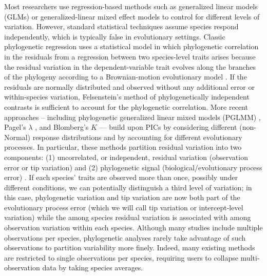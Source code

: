 \documentclass[12pt]{article}
\begin{document}
Most researchers use regression-based methods such as generalized linear models (GLMs) or generalized-linear mixed effect models \citep[GLMMs:][]{bolker2009generalized} to control for different levels of variation.
However, standard statistical techniques assume species respond independently, which is typically false in evolutionary settings.
Classic phylogenetic regression uses a statistical model in which phylogenetic correlation in the residuals from a regression between two species-level traits arises because the residual variation in the dependent-variable trait evolves along the branches of the phylogeny according to a Brownian-motion evolutionary model \citep{felsenstein1985phylogenies}. 
If the residuals are normally distributed and observed without any additional error or within-species variation, Felsenstein's method of phylogenetically independent contrasts  \citep[PICS:][]{felsenstein1985phylogenies, nicolakakis2000forebrain} is sufficient to account for the phylogenetic correlation.
More recent approaches -- including phylogenetic generalized linear mixed models (PGLMM) \citep{ives2011generalized, housworth2004phylogenetic}, Pagel's $\lambda$ \citep{pagel1999inferring}, and Blomberg's $K$ \citep{blomberg2003testing} --- build upon PICs by considering different (non-Normal) response distributions and by accounting for different evolutionary processes. 
In particular, these methods partition residual variation into two components: (1) uncorrelated, or independent, residual variation (observation error or tip variation) and (2) phylogenetic signal  (biological/evolutionary process error) \citep{hansen2012interpreting, housworth2004phylogenetic}.
If each species' traits are observed more than once, possibly under different conditions, we can potentially distinguish a third level of variation; in this case, phylogenetic variation and tip variation are now both part of the evolutionary process error (which we will call tip variation or intercept-level variation) while the among species residual variation is associated with among observation variation within each species.
Although many studies include multiple observations per species, phylogenetic analyses rarely take advantage of such observations to partition variability more finely.
Indeed, many existing methods are restricted to single observations per species, requiring users to collapse multi-observation data by taking species averages.
\end{document}
